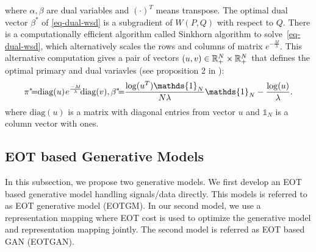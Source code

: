 where $\alpha,\beta$ are dual variables and $(\cdot)^T$ means transpose. The optimal dual vector $\beta^{\ast}$
of \eqref{eq-dual-wsd} is a subgradient of $W(P,Q)$ with respect to $Q$.
There is a computationally efficient algorithm called Sinkhorn
algorithm\cite{2013arXiv1306.0895C, 2013arXiv1310.4375C} to
solve~\eqref{eq-dual-wsd}, which alternatively scales the rows and columns of matrix $e^{-\frac{M}{\lambda}}$. This alternative computation gives a pair of vectors $(u, v) \in \mathbb{R}^N_{+} \times \mathbb{R}^N_{+}$ that defines the optimal primary and dual variavles (see proposition 2 in \cite{2013arXiv1310.4375C}): \vspace{-2pt}
\begin{equation}\label{eq-dual-opt}
  \hspace{-1pt}\pi^{\ast}\hspace{-5pt} =\hspace{-3pt}
  \mathrm{diag}(u) \,\hspace{-1pt} e^{\frac{-M}{\la}} \, \hspace{-4pt}\mathrm{diag}(v),  \beta^{\ast}\hspace{-5pt} =\hspace{-3pt}\frac{\log(u^T)\mathds{1}_N}{N\la} \mathds{1}_N -\frac{\log(u)}{\la}.\vspace{-2pt}
\end{equation}
where $\mathrm{diag}(u)$ is a matrix with diagonal entries from vector $u$ and $\mathds{1}_N$ is a column vector with ones.


\subsection{EOT based Generative Models}

In this subsection, we propose two generative models.
We first develop an EOT based generative model handling signals/data directly. This models is referred to as EOT generative model (EOTGM). 
In our second model, we use a
representation mapping where EOT cost is used to optimize the
generative model and representation mapping jointly. The second model is referred as EOT based GAN (EOTGAN).
\vspace{-3pt}
